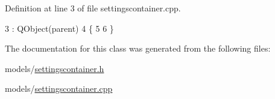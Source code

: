 Definition at line 3 of file settingscontainer.\+cpp.


\begin{DoxyCode}
3                                                     : QObject(parent)
4 \{
5 
6 \}
\end{DoxyCode}


The documentation for this class was generated from the following files\+:\begin{DoxyCompactItemize}
\item 
models/\hyperlink{settingscontainer_8h}{settingscontainer.\+h}\item 
models/\hyperlink{settingscontainer_8cpp}{settingscontainer.\+cpp}\end{DoxyCompactItemize}
